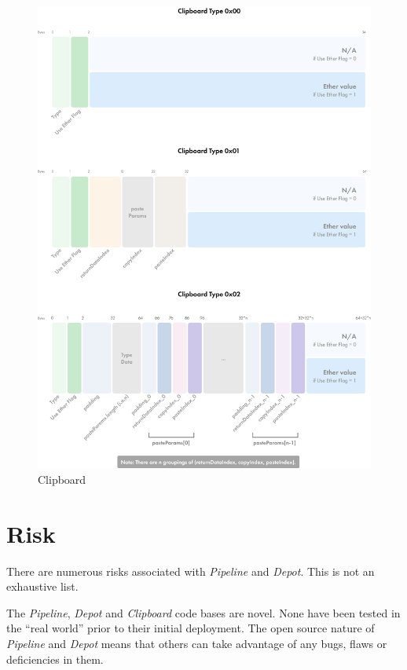\documentclass[tikz]{article}
\newcommand{\term}[1]{\textsl{#1}}
\begin{document}
\begin{figure}[h!]
    \centering
    \includegraphics[scale=.89]{Figure2}
    \caption{Clipboard}
    \label{fig 2}
\end{figure}

\newpage
\section{Risk}
There are numerous risks associated with \term{Pipeline} and \term{Depot}. This is not an exhaustive list.

The \term{Pipeline}, \term{Depot} and \term{Clipboard} code bases are novel. None have been tested in the “real world” prior to their initial deployment. The open source nature of \term{Pipeline} and \term{Depot} means that others can take advantage of any bugs, flaws or deficiencies in them.
\end{document}
